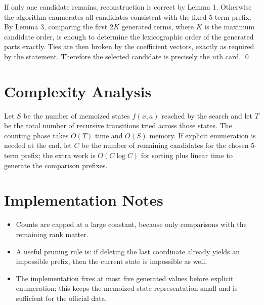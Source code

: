 \documentclass[11pt]{article}
\begin{document}
If only one candidate remains, reconstruction is correct by Lemma 1. Otherwise the algorithm enumerates
all candidates consistent with the fixed 5-term prefix. By Lemma 3, comparing the first $2K$ generated
terms, where $K$ is the maximum candidate order, is enough to determine the lexicographic order of the
generated parts exactly. Ties are then broken by the coefficient vectors, exactly as required by the
statement. Therefore the selected candidate is precisely the $n$th card. \qed

\section*{Complexity Analysis}

Let $S$ be the number of memoized states $f(x,a)$ reached by the search and let $T$ be the total number
of recursive transitions tried across those states. The counting phase takes $O(T)$ time and $O(S)$
memory. If explicit enumeration is needed at the end, let $C$ be the number of remaining candidates for
the chosen 5-term prefix; the extra work is $O(C \log C)$ for sorting plus linear time to generate the
comparison prefixes.

\section*{Implementation Notes}

\begin{itemize}[leftmargin=*]
    \item Counts are capped at a large constant, because only comparisons with the remaining rank matter.
    \item A useful pruning rule is: if deleting the last coordinate already yields an impossible prefix, then the
    current state is impossible as well.
    \item The implementation fixes at most five generated values before explicit enumeration; this keeps the
    memoized state representation small and is sufficient for the official data.
\end{itemize}
\end{document}
